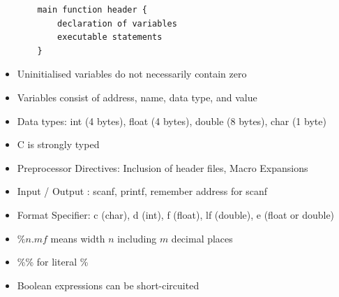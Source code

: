 \documentclass[10pt, portrait]{article}
\begin{document}
\begin{multicols*}{2}
\begin{itemize}
\begin{verbatim}
    main function header {
        declaration of variables
        executable statements
    }
    \end{verbatim}
    \item Uninitialised variables do not necessarily contain zero
    \item Variables consist of address, name, data type, and value
    \item Data types: int (4 bytes), float (4 bytes), double (8 bytes), char (1 byte)
    \item C is strongly typed
    \item Preprocessor Directives: Inclusion of header files, Macro Expansions
    \item Input / Output : scanf, printf, remember address for scanf
    \item Format Specifier: c (char), d (int), f (float), lf (double), e (float or double)
    \item $\%n.mf$ means width $n$ including $m$ decimal places
    \item \%\% for literal \%
    \item Boolean expressions can be short-circuited
\end{itemize}


\end{multicols*}
\end{document}
